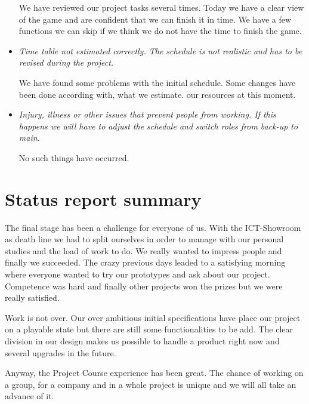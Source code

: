 \documentclass[12pt,a4paper]{article}
\begin{document}
\begin{itemize}
We have reviewed our project tasks several times. Today we have a clear view of the game and are confident that we can finish it in time. We have a few functions we can skip if we think we do not have the time to finish the game.

\item \textit{Time table not estimated correctly. The schedule is not realistic and has to be revised during the project.}

We have found some problems with the initial schedule. Some changes have been done according with, what we estimate. our resources at this moment.

\item \textit{Injury, illness or other issues that prevent people from working. If this happens we will have to adjust the schedule and switch roles from back-up to main.}

No such things have occurred.
\end{itemize}

\section{Status report summary}

The final stage has been a challenge for everyone of us. With the ICT-Showroom as death line we had to split ourselves in order to manage with our personal studies and the load of work to do. We really wanted to impress people and finally we succeeded. The crazy previous days leaded to a satisfying morning where everyone wanted to try our prototypes and ask about our project. Competence was hard and finally other projects won the prizes but we were really satisfied.

Work is not over. Our over ambitious initial specifications have place our project on a playable state but there are still some functionalities to be add. The clear division in our design makes us possible to handle a product right now and several upgrades in the future.

Anyway, the Project Course experience has been great. The chance of working on a group, for a company and in a whole project is unique and we will all take an advance of it.
\end{document}
